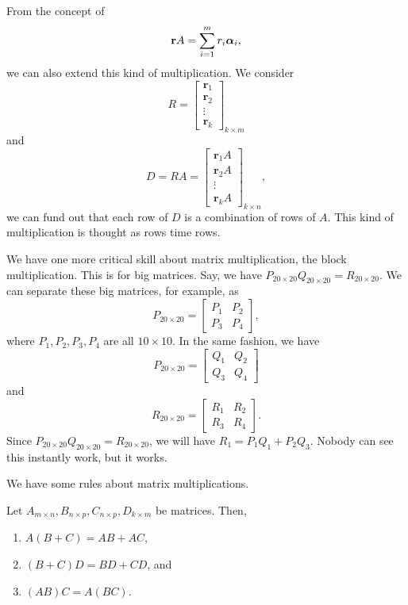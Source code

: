 \documentclass[11pt]{article}
\theoremstyle{break}
\theoremstyle{no_label}
\newcommand{\bfr}{\textbf{r}}
\newcommand{\bfalpha}{\text{\boldmath$\alpha$}}
\numberwithin{equation}{section}
\begin{document}
From the concept of $$\bfr A=\sum_{i=1}^{m}r_i\bfalpha_i,$$ we can also extend this kind of multiplication. We consider $$R=\begin{bmatrix}
    \bfr_1 \\ \bfr_2 \\ \vdots \\ \bfr_k
\end{bmatrix}_{k\times m}$$ and $$D=RA=\begin{bmatrix}
    \bfr_1A \\ \bfr_2A \\ \vdots \\ \bfr_kA
\end{bmatrix}_{k\times n},$$ we can fund out that each row of $D$ is a combination of rows of $A$. This kind of multiplication is thought as rows time rows.

We have one more critical skill about matrix multiplication, the block multiplication. This is for big matrices. Say, we have $P_{20\times 20}Q_{20\times 20}=R_{20\times 20}$. We can separate these big matrices, for example, as $$P_{20\times 20}=\begin{bmatrix}
    P_1 & P_2\\
    P_3 & P_4
\end{bmatrix},$$ where $P_1, P_2, P_3, P_4$ are all $10\times 10$. In the same fashion, we have $$P_{20\times 20}=\begin{bmatrix}
    Q_1 & Q_2\\
    Q_3 & Q_4
\end{bmatrix}$$ and $$R_{20\times 20}=\begin{bmatrix}
    R_1 & R_2\\
    R_3 & R_4
\end{bmatrix}.$$ Since $P_{20\times 20}Q_{20\times 20}=R_{20\times 20}$, we will have $R_1=P_1Q_1+P_2Q_3$. Nobody can see this instantly work, but it works.

We have some rules about matrix multiplications.

\begin{theorem}
    Let $A_{m\times n}, B_{n\times p}, C_{n\times p}, D_{k\times m}$ be matrices. Then,
    \begin{enumerate}
        \item $A(B+C)=AB+AC$,
        \item $(B+C)D=BD+CD$, and
        \item $(AB)C=A(BC)$.
    \end{enumerate}
\end{theorem}
\end{document}
